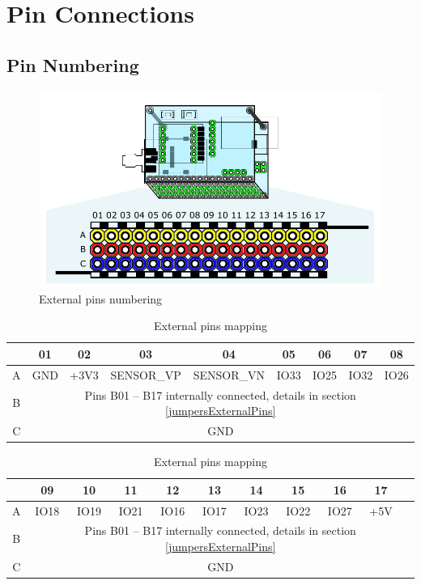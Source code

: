 \section{Pin Connections}

\subsection{Pin Numbering}
\label{pinNumbering}

\begin{figure}[H]
	\centering
	\includegraphics[scale=1]{img/externalPins.pdf}
	\caption{External pins numbering}
	\label{fig:externalPins}
\end{figure}

\begin{table}[H]
	\centering
	\begin{tabular}{|c||c|c|c|c|c|c|c|c|}
		\hline
		& 01 & 02 & 03 & 04 & 05 & 06 & 07 & 08 \\
		\hline \hline
		A & GND & +3V3 & SENSOR\_VP & SENSOR\_VN & IO33 & IO25 & IO32 & IO26 \\
		B & \multicolumn{8}{|c|}{Pins B01 -- B17 internally connected, details in section \ref{jumpersExternalPins}} \\
		C & \multicolumn{8}{|c|}{GND} \\
		\hline
	\end{tabular}

	\vspace{0.5cm}
	
	\begin{tabular}{|c||c|c|c|c|c|c|c|c|c|c|}
		\hline
		& 09 & 10 & 11 & 12 & 13 & 14 & 15 & 16 & 17 & \\
		\hline \hline
		A & IO18 & IO19 & IO21 & IO16 & IO17 & IO23 & IO22 & IO27 & +5V & \\
		B & \multicolumn{10}{|c|}{Pins B01 -- B17 internally connected, details in section \ref{jumpersExternalPins}} \\
		C & \multicolumn{10}{|c|}{GND} \\
		\hline
	\end{tabular}
	\caption{External pins mapping}
	\label{tab:externalPins}
\end{table}

